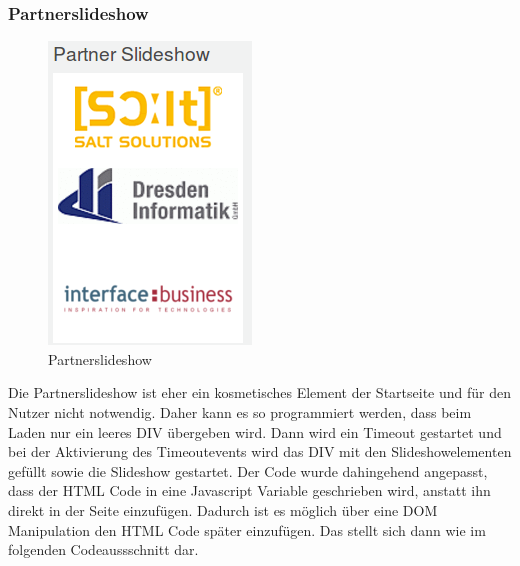 \subsubsection{Partnerslideshow}
\begin{figure}[!ht]
  \centering
  \includegraphics[scale=0.5]{material/partner_slideshow.png}
  \caption{Partnerslideshow}
  \label{fig:partnerslideshow}
\end{figure} 

Die Partnerslideshow ist eher ein kosmetisches Element der Startseite und für den Nutzer nicht notwendig. Daher kann es so programmiert werden, dass beim Laden nur ein leeres DIV übergeben wird. Dann wird ein Timeout gestartet und bei der Aktivierung des Timeoutevents wird das DIV mit den Slideshowelementen gefüllt sowie die Slideshow gestartet. Der Code wurde dahingehend angepasst, dass der HTML Code in eine Javascript Variable geschrieben wird, anstatt ihn direkt in der Seite einzufügen. Dadurch ist es möglich über eine DOM Manipulation den HTML Code später einzufügen. Das stellt sich dann wie im folgenden Codeaussschnitt dar.

